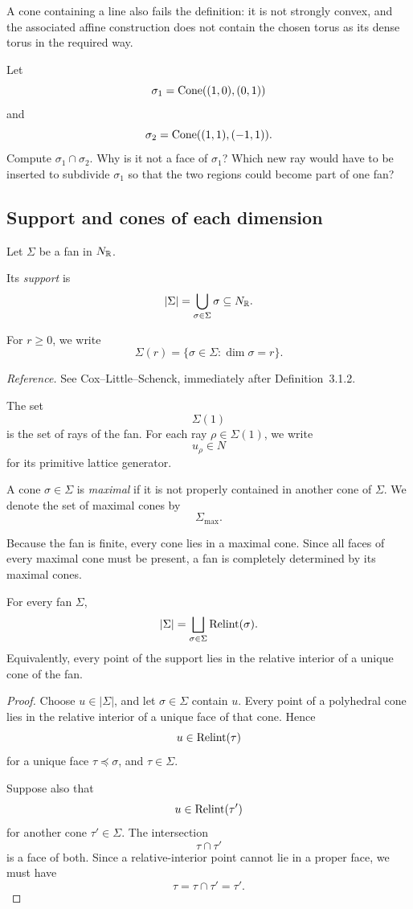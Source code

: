 A cone containing a line also fails the definition: it is not strongly
convex, and the associated affine construction does not contain the
chosen torus as its dense torus in the required way.

\begin{pauseandthink}
Let
\[
\sigma_1=\operatorname{Cone}((1,0),(0,1))
\]
and
\[
\sigma_2=\operatorname{Cone}((1,1),(-1,1)).
\]
Compute \(\sigma_1\cap\sigma_2\). Why is it not a face of
\(\sigma_1\)? Which new ray would have to be inserted to subdivide
\(\sigma_1\) so that the two regions could become part of one fan?
\end{pauseandthink}

\subsection{Support and cones of each dimension}

\begin{definition}
Let \(\Sigma\) be a fan in \(N_{\mathbb{R}}\).

Its \emph{support} is
\[
|\Sigma|
=
\bigcup_{\sigma\in\Sigma}\sigma
\subseteq N_{\mathbb{R}}.
\]

For \(r\geq0\), we write
\[
\Sigma(r)
=
\{\sigma\in\Sigma:\dim\sigma=r\}.
\]
\end{definition}

\noindent
\textit{Reference.}
See Cox--Little--Schenck, immediately after Definition~3.1.2.

The set
\[
\Sigma(1)
\]
is the set of rays of the fan. For each ray \(\rho\in\Sigma(1)\), we
write
\[
u_\rho\in N
\]
for its primitive lattice generator.

A cone \(\sigma\in\Sigma\) is \emph{maximal} if it is not properly
contained in another cone of \(\Sigma\). We denote the set of maximal
cones by
\[
\Sigma_{\max}.
\]

Because the fan is finite, every cone lies in a maximal cone. Since
all faces of every maximal cone must be present, a fan is completely
determined by its maximal cones.

\begin{proposition}
\label{prop:relative-interiors-partition-fan}
For every fan \(\Sigma\),
\[
|\Sigma|
=
\bigsqcup_{\sigma\in\Sigma}
\operatorname{Relint}(\sigma).
\]
Equivalently, every point of the support lies in the relative interior
of a unique cone of the fan.
\end{proposition}

\begin{proof}
Choose \(u\in|\Sigma|\), and let \(\sigma\in\Sigma\) contain \(u\).
Every point of a polyhedral cone lies in the relative interior of a
unique face of that cone. Hence
\[
u\in\operatorname{Relint}(\tau)
\]
for a unique face \(\tau\preceq\sigma\), and \(\tau\in\Sigma\).

Suppose also that
\[
u\in\operatorname{Relint}(\tau')
\]
for another cone \(\tau'\in\Sigma\). The intersection
\[
\tau\cap\tau'
\]
is a face of both. Since a relative-interior point cannot lie in a
proper face, we must have
\[
\tau=\tau\cap\tau'=\tau'.
\]
\end{proof}

